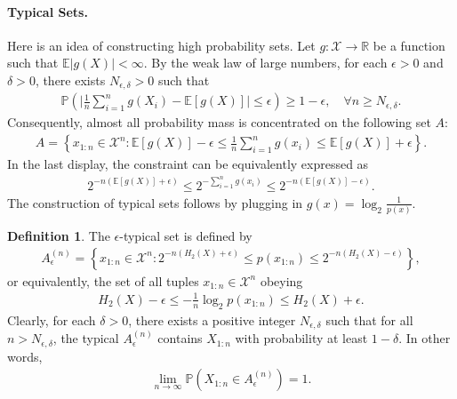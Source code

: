 \documentclass{article}
\numberwithin{equation}{section}
\newcommand{\E}{\mathbb{E}}
\newcommand{\bbP}{\mathbb{P}}
\newcommand{\bbR}{\mathbb{R}}
\renewcommand{\cal}{\mathcal}
\theoremstyle{plain}
\theoremstyle{definition}
\newtheorem{definition}[theorem]{Definition}
\begin{document}
\paragraph{Typical Sets.}
Here is an idea of constructing high probability sets. Let $g:\mathcal{X}\to\bbR$ be a function such that $\E\vert g(X)\vert<\infty$. By the weak law of large numbers, for each $\epsilon>0$ and $\delta>0$, there exists $N_{\epsilon,\delta}>0$ such that
\begin{align*}
	\bbP\left(\biggl\vert\frac{1}{n}\sum_{i=1}^n g(X_i)-\E[g(X)]\biggr\vert\leq\epsilon\right)\geq 1-\epsilon,\quad\forall n\geq N_{\epsilon,\delta}.
\end{align*}
Consequently, almost all probability mass is concentrated on the following set $A$:
\begin{align*}
	A=\left\{x_{1:n}\in\cal{X}^n:\E\left[g(X)\right]-\epsilon\leq\frac{1}{n}\sum_{i=1}^n g(x_i)\leq\E\left[g(X)\right]+\epsilon\right\}.
\end{align*}
In the last display, the constraint can be equivalently expressed as
\begin{align*}
	2^{-n(\E\left[g(X)\right]+\epsilon)}\leq 2^{-\sum_{i=1}^n g(x_i)}\leq 2^{-n(\E\left[g(X)\right]-\epsilon)}.
\end{align*}
The construction of typical sets follows by plugging in $g(x)=\log_2\frac{1}{p(x)}$.
\begin{definition}
The $\epsilon$-typical set is defined by
\begin{align*}
	A^{(n)}_\epsilon=\left\{x_{1:n}\in\cal{X}^n:2^{-n(H_2(X)+\epsilon)}\leq p(x_{1:n})\leq 2^{-n(H_2(X)-\epsilon)}\right\},
\end{align*}
or equivalently, the set of all tuples $x_{1:n}\in\cal{X}^n$ obeying
\begin{align*}
	H_2(X)-\epsilon\leq-\frac{1}{n}\log_2 p(x_{1:n})\leq H_2(X)+\epsilon.
\end{align*}
Clearly, for each $\delta>0$, there exists a positive integer $N_{\epsilon,\delta}$ such that for all $n>N_{\epsilon,\delta}$, the typical $A_\epsilon^{(n)}$ contains $X_{1:n}$ with probability at least $1-\delta$. In other words,
\begin{align*}
	\lim_{n\to\infty}\bbP\left(X_{1:n}\in A_\epsilon^{(n)}\right)=1.
\end{align*}
\end{definition}
\end{document}
